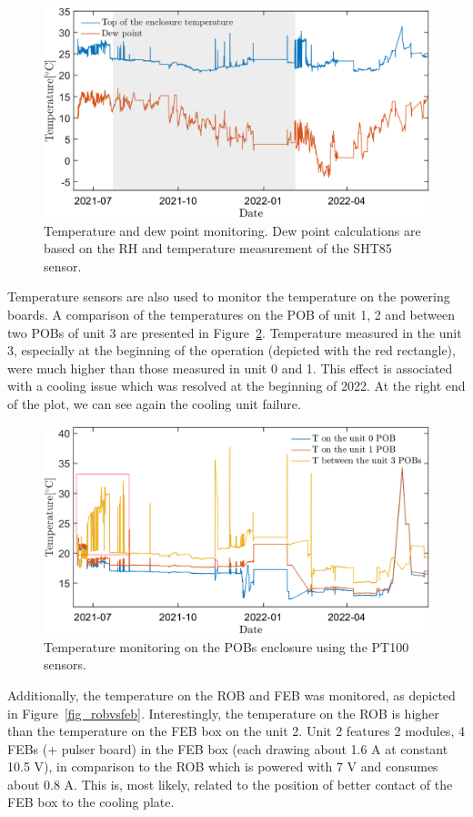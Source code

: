 \begin{figure}[!h]
\centering
\includegraphics[width=0.9\columnwidth]{Chapter6/DCS/images/dew.png}
\caption{Temperature and dew point monitoring. Dew point calculations are based on the \gls{RH} and temperature measurement of the SHT85 sensor.}
\label{fig_dew}
\end{figure}


Temperature sensors are also used to monitor the temperature on the powering boards. A comparison of the temperatures on the \gls{POB} of unit 1, 2 and between two \glspl{POB} of unit 3 are presented in Figure~\ref{fig_POB1}. Temperature measured in the unit 3, especially at the beginning of the operation (depicted with the red rectangle), were much higher than those measured in unit 0 and 1. This effect is associated with a cooling issue which was resolved at the beginning of 2022. At the right end of the plot, we can see again the cooling unit failure. 
\begin{figure}[!h]
\centering
\includegraphics[width=0.9\columnwidth]{Chapter6/DCS/images/POB1.png}
\caption{Temperature monitoring on the \glspl{POB} enclosure using the PT100 sensors.}
\label{fig_POB1}
\end{figure}

Additionally, the temperature on the \gls{ROB} and \gls{FEB} was monitored, as depicted in Figure~\ref{fig_robvsfeb}. Interestingly, the temperature on the \gls{ROB} is higher than the temperature on the \gls{FEB} box on the unit 2. Unit 2 features 2 modules, 4 \gls{FEB}s (+ pulser board) in the \gls{FEB} box (each drawing about 1.6 A at constant 10.5 V), in comparison to the \gls{ROB} which is powered with 7 V and consumes about 0.8 A. This is, most likely, related to the position of better contact of the \gls{FEB} box to the cooling plate.


